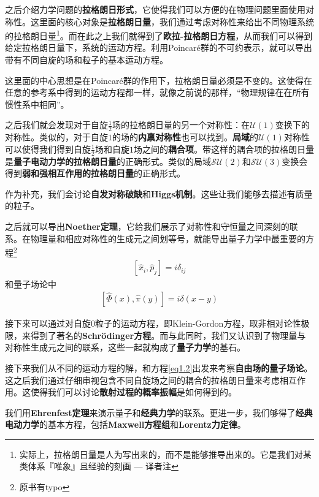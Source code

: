 之后介绍力学问题的{\bf 拉格朗日形式}，它使得我们可以方便的在物理问题里面使用对称性。这里面的核心对象是{\bf 拉格朗日量}，我们通过考虑对称性来给出不同物理系统的拉格朗日量\footnote{实际上，拉格朗日量是人为写出来的，而不是能够推导出来的。它是我们对某类体系『唯象』且经验的刻画 --- 译者注}。而在此之上我们就得到了{\bf 欧拉-拉格朗日方程}，从而我们可以得到给定拉格朗日量下，系统的运动方程。利用Poincaré群的不可约表示，就可以导出带有不同自旋的场和粒子的基本运动方程。

这里面的中心思想是在Poincaré群的作用下，拉格朗日量必须是不变的。这使得在任意的参考系中得到的运动方程都一样，就像之前说的那样，“物理规律在在所有惯性系中相同”。

之后我们就会发现对于自旋$\tfrac{1}{2}$场的拉格朗日量的另一个对称性：在$\mathcal{U}(1)$变换下的对称性。类似的，对于自旋$1$的场的{\bf 内禀对称性}也可以找到。{\bf 局域}的$\mathcal{U}(1)$对称性可以使得我们得到自旋$\tfrac{1}{2}$场和自旋$1$场之间的{\bf 耦合项}。带这样的耦合项的拉格朗日量是{\bf 量子电动力学的拉格朗日量}的正确形式。类似的局域$\mathcal{SU}(2)$和$\mathcal{SU}(3)$变换会得到{\bf 弱和强相互作用的拉格朗日量}的正确形式。

作为补充，我们会讨论{\bf 自发对称破缺}和{\bf Higgs机制}。这些让我们能够去描述有质量的粒子。

之后就可以导出{\bf Noether定理}，它给我们展示了对称性和守恒量之间深刻的联系。在物理量和相应对称性的生成元之间划等号，就能导出量子力学中最重要的方程\footnote{原书有typo}
\begin{align}\label{eq1.1}
[\hat{x}_i,\hat{p}_j]=i\delta_{ij}
\end{align}
和量子场论中
\begin{align}\label{eq1.2}
[\hat{\Phi}(x),\hat{\pi}(y)]=i\delta(x-y)
\end{align}

接下来可以通过对自旋$0$粒子的运动方程，即Klein-Gordon方程，取非相对论性极限，来得到了著名的{\bf Schrödinger方程}。而与此同时，我们又认识到了物理量与对称性生成元之间的联系，这些一起就构成了{\bf 量子力学}的基石。

接下来我们从不同的运动方程的解，和方程\eqref{eq1.2}出发来考察{\bf 自由场的量子场论}。这之后我们通过仔细审视包含不同自旋场之间的耦合的拉格朗日量来考虑相互作用。这使得我们可以讨论{\bf 散射过程的概率振幅}是如何得到的。

我们用{\bf Ehrenfest定理}来演示量子和{\bf 经典力学}的联系。更进一步，我们够得了{\bf 经典电动力学}的基本方程，包括{\bf Maxwell方程组}和{\bf Lorentz力定律}。

